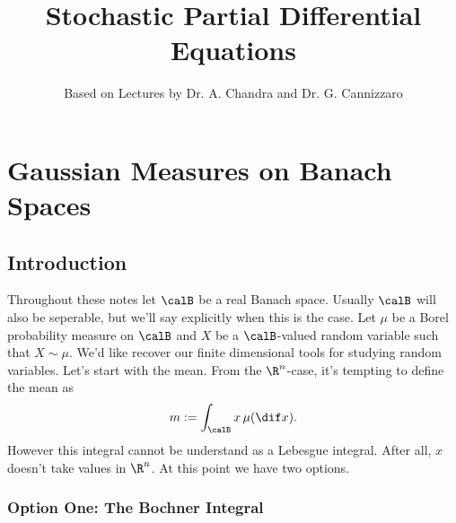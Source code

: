 \documentclass[fontsize=12pt, DIV=10]{scrreprt}
\title{Stochastic Partial Differential Equations}
\author{Based on Lectures by Dr. A. Chandra and Dr. G. Cannizzaro}
\theoremstyle{mydefn}
\theoremstyle{remark}
\newcommand{\defeq}{:=}
\begin{document}
\maketitle

\tableofcontents

\chapter{Gaussian Measures on Banach Spaces}

\section{Introduction}

Throughout these notes let $\calB$ be a real Banach space. Usually $\calB$ will also be seperable, but we'll say explicitly when this is the case. Let $\mu$ be a Borel probability measure on $\calB$ and $X$ be a $\calB$-valued random variable such that $X \sim \mu$. We'd like recover our finite dimensional tools for studying random variables. Let's start with the mean. From the $\R^n$-case, it's tempting to define the mean as
\begin{equation}
	m \defeq \int_{\calB} x \, \mu(\dif x).
\end{equation}
However this integral cannot be understand as a Lebesgue integral. After all, $x$ doesn't take values in $\R^n$. At this point we have two options.

\subsection{Option One: The Bochner Integral}
\end{document}
